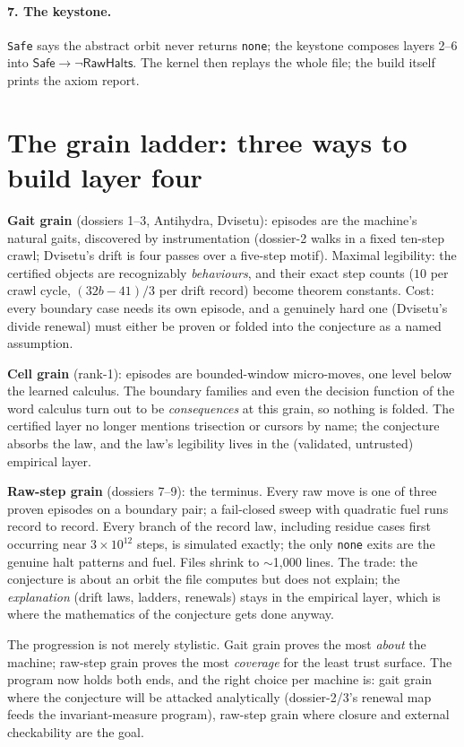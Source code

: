 \documentclass[11pt]{article}
\begin{document}
\paragraph{7. The keystone.} \texttt{Safe} says the abstract orbit
never returns \texttt{none}; the keystone composes layers 2--6 into
$\mathsf{Safe} \rightarrow \lnot\mathsf{RawHalts}$. The kernel then
replays the whole file; the build itself prints the axiom report.

\section*{The grain ladder: three ways to build layer four}

\textbf{Gait grain} (dossiers 1--3, Antihydra, Dvisetu): episodes are
the machine's natural gaits, discovered by instrumentation (dossier-2
walks in a fixed ten-step crawl; Dvisetu's drift is four passes over
a five-step motif). Maximal legibility: the certified objects are
recognizably \emph{behaviours}, and their exact step counts
($10$ per crawl cycle, $(32b-41)/3$ per drift record) become theorem
constants. Cost: every boundary case needs its own episode, and a
genuinely hard one (Dvisetu's divide renewal) must either be proven
or folded into the conjecture as a named assumption.

\textbf{Cell grain} (rank-1): episodes are bounded-window
micro-moves, one level below the learned calculus. The boundary
families and even the decision function of the word calculus turn
out to be \emph{consequences} at this grain, so nothing is folded.
The certified layer no longer mentions trisection or cursors by
name; the conjecture absorbs the law, and the law's legibility lives
in the (validated, untrusted) empirical layer.

\textbf{Raw-step grain} (dossiers 7--9): the terminus. Every raw
move is one of three proven episodes on a boundary pair; a
fail-closed sweep with quadratic fuel runs record to record. Every
branch of the record law, including residue cases first occurring
near $3\times10^{12}$ steps, is simulated exactly; the only
\texttt{none} exits are the genuine halt patterns and fuel. Files
shrink to $\sim$1{,}000 lines. The trade: the conjecture is about an
orbit the file computes but does not explain; the \emph{explanation}
(drift laws, ladders, renewals) stays in the empirical layer, which
is where the mathematics of the conjecture gets done anyway.

The progression is not merely stylistic. Gait grain proves the most
\emph{about} the machine; raw-step grain proves the most
\emph{coverage} for the least trust surface. The program now holds
both ends, and the right choice per machine is: gait grain where the
conjecture will be attacked analytically (dossier-2/3's renewal map
feeds the invariant-measure program), raw-step grain where closure
and external checkability are the goal.
\end{document}
